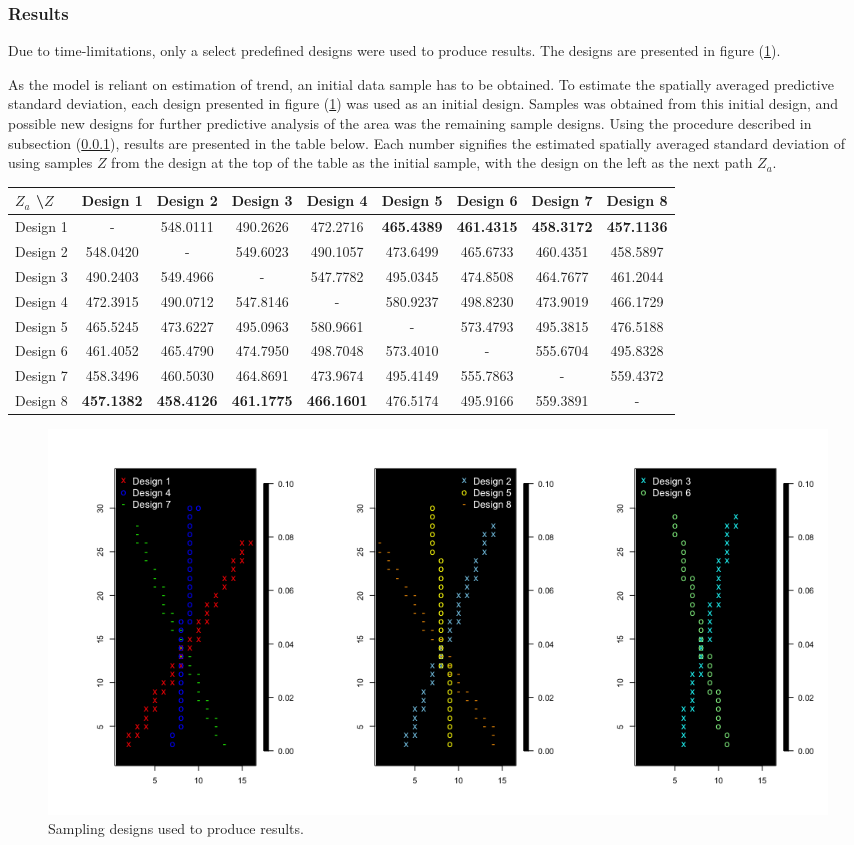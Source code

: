 \subsubsection{Results}	
Due to time-limitations, only a select predefined designs were used to produce results. The designs are presented in figure (\ref{fig:designs}). 

As the model is reliant on estimation of trend, an initial data sample has to be obtained. To estimate the spatially averaged predictive standard deviation, each design presented in figure (\ref{fig:designs}) was used as an initial design. Samples was obtained from this initial design, and possible new designs for further predictive analysis of the area was the remaining sample designs. Using the procedure described in subsection (\ref{}), results are presented in the table below. Each number signifies the estimated spatially averaged standard deviation of using samples $Z$ from the design at the top of the table as the initial sample, with the design  on the left as the next path $Z_a$. 
\\

\hspace{-25pt}
\begin{tabular}{ l || c | c | c | c | c | c | c | c } 
\label{tab:bayes_predictive_variance}
$Z_a$ \textbackslash  $Z$ & Design 1 & Design 2 & Design 3 & Design 4 & Design 5 & Design 6 & Design 7 & Design 8 \\
\hline \hline
Design 1 & - & 548.0111 & 490.2626 & 472.2716 & \textbf{465.4389} & \textbf{461.4315} & \textbf{458.3172} & \textbf{457.1136} \\
Design 2 & 548.0420 & - & 549.6023 & 490.1057 & 473.6499 & 465.6733 & 460.4351 & 458.5897 \\
Design 3 & 490.2403 & 549.4966 & - & 547.7782 & 495.0345 & 474.8508 & 464.7677 & 461.2044 \\
Design 4 & 472.3915 & 490.0712 & 547.8146 & - & 580.9237 & 498.8230 & 473.9019 & 466.1729 \\
Design 5 & 465.5245 & 473.6227 & 495.0963 & 580.9661 & - & 573.4793 & 495.3815 & 476.5188 \\
Design 6 & 461.4052 & 465.4790 & 474.7950 & 498.7048 & 573.4010 & - & 555.6704 & 495.8328 \\
Design 7 & 458.3496 & 460.5030 & 464.8691 & 473.9674 & 495.4149 & 555.7863 & - & 559.4372 \\
Design 8 & \textbf{457.1382} & \textbf{458.4126} & \textbf{461.1775} & \textbf{466.1601} & 476.5174 & 495.9166 & 559.3891 & -
\end{tabular}

\begin{figure}[p]
	\hspace{-55pt}
	\includegraphics[width=1.25\linewidth]{figurer/design_lines.png}
    \caption{Sampling designs used to produce results.}
    \label{fig:designs}
\end{figure}
